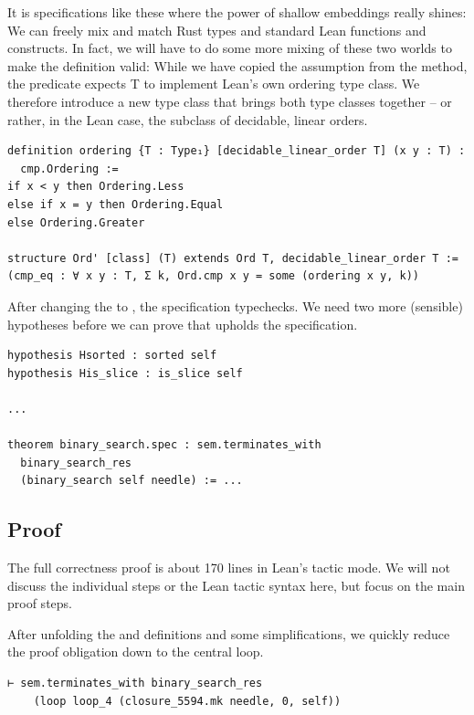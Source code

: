 It is specifications like these where the power of shallow embeddings really
shines: We can freely mix and match Rust types and standard Lean functions and
constructs. In fact, we will have to do some more mixing of these two worlds to make
the definition valid: While we have copied the assumption  from
the  method, the  predicate expects T to
implement Lean's own ordering type class. We therefore introduce a new type class
 that brings both type classes together -- or rather, in the Lean case, the
subclass of decidable, linear orders.

\begin{verbatim}
definition ordering {T : Type₁} [decidable_linear_order T] (x y : T) :
  cmp.Ordering :=
if x < y then Ordering.Less
else if x = y then Ordering.Equal
else Ordering.Greater

structure Ord' [class] (T) extends Ord T, decidable_linear_order T :=
(cmp_eq : ∀ x y : T, Σ k, Ord.cmp x y = some (ordering x y, k))
\end{verbatim}

After changing the  to \lean{[Ord' T]}, the
specification typechecks. We need two more (sensible) hypotheses before we can
prove that  upholds the specification.

\begin{verbatim}
hypothesis Hsorted : sorted self
hypothesis His_slice : is_slice self

...

theorem binary_search.spec : sem.terminates_with
  binary_search_res
  (binary_search self needle) := ...
\end{verbatim}

\subsection{Proof}

The full correctness proof is about 170 lines in Lean's tactic mode. We will not
discuss the individual steps or the Lean tactic syntax here, but focus on the main
proof steps.

After unfolding the  and 
definitions and some simplifications, we quickly reduce the proof obligation
down to the central loop.

\begin{verbatim}
⊢ sem.terminates_with binary_search_res
    (loop loop_4 (closure_5594.mk needle, 0, self))
\end{verbatim}

